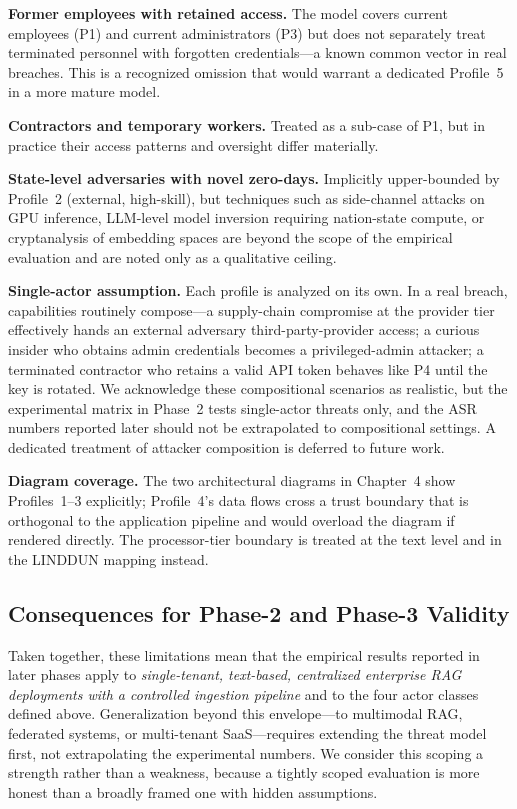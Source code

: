 \documentclass[12pt, a4paper]{report}
\begin{document}
\begin{limitbox}
\textbf{Former employees with retained access.} The model covers current
employees (P1) and current administrators (P3) but does not separately
treat terminated personnel with forgotten credentials---a known common
vector in real breaches. This is a recognized omission that would warrant
a dedicated Profile~5 in a more mature model.

\textbf{Contractors and temporary workers.} Treated as a sub-case of P1,
but in practice their access patterns and oversight differ materially.

\textbf{State-level adversaries with novel zero-days.} Implicitly
upper-bounded by Profile~2 (external, high-skill), but techniques such as
side-channel attacks on GPU inference, LLM-level model inversion
requiring nation-state compute, or cryptanalysis of embedding spaces are
beyond the scope of the empirical evaluation and are noted only as a
qualitative ceiling.

\textbf{Single-actor assumption.} Each profile is analyzed on its own.
In a real breach, capabilities routinely compose---a supply-chain
compromise at the provider tier effectively hands an external adversary
third-party-provider access; a curious insider who obtains admin
credentials becomes a privileged-admin attacker; a terminated contractor
who retains a valid API token behaves like P4 until the key is rotated.
We acknowledge these compositional scenarios as realistic, but the
experimental matrix in Phase~2 tests single-actor threats only, and the
ASR numbers reported later should not be extrapolated to compositional
settings. A dedicated treatment of attacker composition is deferred to
future work.

\textbf{Diagram coverage.} The two architectural diagrams in Chapter~4
show Profiles~1--3 explicitly; Profile~4's data flows cross a trust
boundary that is orthogonal to the application pipeline and would
overload the diagram if rendered directly. The processor-tier boundary
is treated at the text level and in the LINDDUN mapping instead.
\end{limitbox}

\subsection{Consequences for Phase-2 and Phase-3 Validity}

Taken together, these limitations mean that the empirical results reported
in later phases apply to \emph{single-tenant, text-based, centralized
enterprise RAG deployments with a controlled ingestion pipeline} and
to the four actor classes defined above. Generalization beyond this
envelope---to multimodal RAG, federated systems, or multi-tenant SaaS---requires
extending the threat model first, not extrapolating the experimental numbers.
We consider this scoping a strength rather than a weakness, because a
tightly scoped evaluation is more honest than a broadly framed one with
hidden assumptions.
\end{document}
